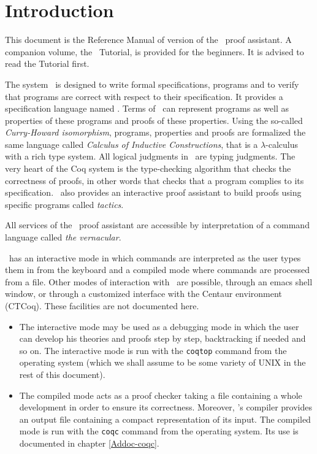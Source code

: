 \chapter*{Introduction}

This document is the Reference Manual of version \coqversion{} of the \Coq\ 
proof assistant. A companion volume, the \Coq\ Tutorial, is provided
for the beginners. It is advised to read the Tutorial first.

The system \Coq\ is designed to write formal specifications,
programs and to verify that programs are correct with respect to their
specification. It provides a specification language named \gallina. Terms of
\gallina\ can represent programs as well as properties of these
programs and proofs of these properties. Using the so-called
\textit{Curry-Howard isomorphism}, programs, properties and proofs are
formalized the same 
language called \textit{Calculus of Inductive Constructions}, that is
a $\lambda$-calculus with a rich type system.
All logical judgments in \Coq\ are typing judgments. The very heart of the Coq
system is the type-checking algorithm that checks the correctness of
proofs, in other words that checks that a program complies to its
specification. \Coq\ also provides an interactive proof assistant to
build proofs using specific programs called \textit{tactics}.

All services of the \Coq\ proof assistant are accessible by
interpretation of a command language called \textit{the vernacular}.

\Coq\ has an interactive mode in which commands are interpreted as the
user types them in from the keyboard and a compiled mode where
commands are processed from a file.  Other modes of interaction with
\Coq\ are possible, through an emacs shell window, or through a
customized interface with the Centaur environment (CTCoq). These
facilities are not documented here.

\begin{itemize}
\item The interactive mode may be used as a debugging mode in which
  the user can develop his theories and proofs step by step,
  backtracking if needed and so on. The interactive mode is run with
  the {\tt coqtop} command from the operating system (which we shall
  assume to be some variety of UNIX in the rest of this document).
\item The compiled mode acts as a proof checker taking a file
  containing a whole development in order to ensure its correctness.
  Moreover, \Coq's compiler provides an output file containing a
  compact representation of its input. The compiled mode is run with
  the {\tt coqc} command from the operating system. Its use is
  documented in chapter \ref{Addoc-coqc}.
\end{itemize}

